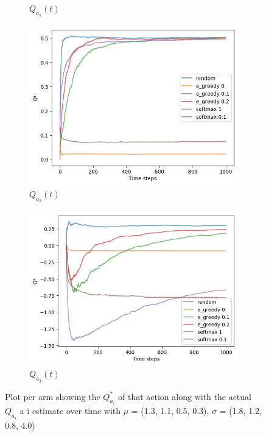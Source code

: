 \documentclass[letterpaper]{article}
\begin{document}
\begin{figure}[H]
\begin{subfigure}{.5\textwidth}
    \caption{$Q_{a_{1}}(t)$}
    \label{fig:qta_1_ex2}
  \end{subfigure}
  \begin{subfigure}{.5\textwidth}
    \centering
    \includegraphics[width=1\linewidth]{images/assign3/ex2/qta_2}
    \caption{$Q_{a_{2}}(t)$}
    \label{fig:qta_2_ex2}
  \end{subfigure}
  \begin{subfigure}{.5\textwidth}
    \centering
    \includegraphics[width=1\linewidth]{images/assign3/ex2/qta_3}
    \caption{$Q_{a_{3}}(t)$}
    \label{fig:qta_3_ex2}
  \end{subfigure}

    \caption{Plot per arm showing
    the $Q^{*}_{a_{i}}$
    of that action along with the actual $Q_{a_{i}}$ a i estimate over time
    with
    $\mu$ = (1.3, 1.1, 0.5, 0.3), $\sigma$ = (1.8, 1.2, 0.8, 4.0)}
    \label{fig:qtas_ex2}
\end{figure}
\end{document}
